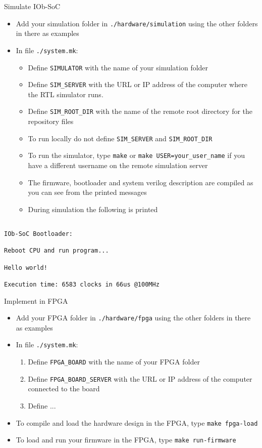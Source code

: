 \documentclass [xcolor=svgnames, t] {beamer}
\begin{document}
\begin{frame}[fragile]{Simulate IOb-SoC}
\begin{itemize}
  \item Add your simulation folder in {\tt ./hardware/simulation} using the other folders in there as examples
  \item In  file {\tt ./system.mk}:
  \begin{itemize}
    \item Define {\tt SIMULATOR} with the name of your simulation folder
    \item Define {\tt SIM\_SERVER} with the URL or IP address of the computer where the RTL simulator runs.
    \item Define {\tt SIM\_ROOT\_DIR} with the name of the remote root directory for the repository files
    \item To run locally do not define {\tt SIM\_SERVER} and {\tt SIM\_ROOT\_DIR}
    \item To run the simulator, type {\tt make} or {\tt make USER=your\_user\_name} if you have a different username on the remote simulation server
    \item The firmware, bootloader and system verilog description are compiled as you can see from the printed messages
    \item During simulation the following is printed
  \end{itemize}
\end{itemize}
\begin{tiny}
\begin{lstlisting}

IOb-SoC Bootloader:

Reboot CPU and run program...

Hello world!

Execution time: 6583 clocks in 66us @100MHz

\end{lstlisting}
\end{tiny}
\end{frame}


\begin{frame}{Implement in FPGA}
\begin{itemize}
  \item Add your FPGA folder in {\tt ./hardware/fpga} using the other folders in there as examples
  \item In file {\tt ./system.mk}:
  \begin{enumerate}
    \item Define {\tt FPGA\_BOARD} with the name of your FPGA folder
    \item Define {\tt FPGA\_BOARD\_SERVER} with the URL or IP address of the computer connected to the board
    \item Define ...
  \end{enumerate}
  \item To compile and load the hardware design in the FPGA, type {\tt make fpga-load}
  \item To load and run your firmware in the FPGA, type {\tt make run-firmware}
\end{itemize}
\end{frame}
\end{document}
